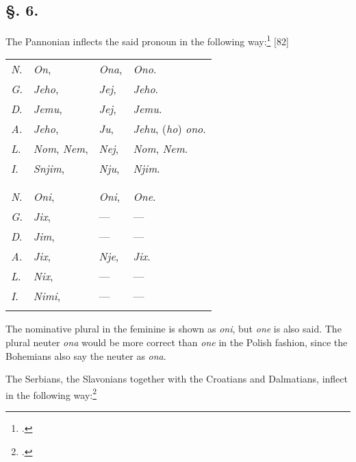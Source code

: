 \subsection*{\hspace*{\fill}§. 6.\hspace*{\fill}}

The Pannonian inflects the said pronoun in the following way:\footnote{\citet[64--65]{bernolak_grammatica_1790}.} [82]

\begin{longtable}{ l l l l }
    \lsptoprule
    \multicolumn{4}{ c }{Singular.} \\
    \midrule
    \textit{N}. & \textit{On}, & \textit{Ona}, & \textit{Ono}. \\
    \textit{G}. & \textit{Jeho}, & \textit{Jej}, & \textit{Jeho}. \\
    \textit{D}. & \textit{Jemu}, & \textit{Jej}, & \textit{Jemu}. \\
    \textit{A}. & \textit{Jeho}, & \textit{Ju}, & \textit{Jehu}, (\textit{ho}) \textit{ono}. \\
    \textit{L}. & \textit{Nom}, \textit{Nem}, & \textit{Nej}, & \textit{Nom}, \textit{Nem}. \\
    \textit{I}. & \textit{Snjim}, & \textit{Nju}, & \textit{Njim}. \\
    \lspbottomrule
    \\
    \lsptoprule
    \multicolumn{4}{ c }{Plural.} \\
    \midrule
    \textit{N}. & \textit{Oni}, & \textit{Oni}, & \textit{One}. \\
    \textit{G}. & \textit{Jix}, & — & — \\
    \textit{D}. & \textit{Jim}, & — & — \\
    \textit{A}. & \textit{Jix}, & \textit{Nje}, & \textit{Jix}. \\
    \textit{L}. & \textit{Nix}, & — & — \\
    \textit{I}. & \textit{Nimi}, & — & — \\
    \lspbottomrule
\end{longtable}

The nominative plural in the feminine is shown as \textit{oni}, but \textit{one} is also said. The plural neuter \textit{ona} would be more correct than \textit{one} in the Polish fashion, since the Bohemians also say the neuter as \textit{ona}.

The Serbians, the Slavonians together with the Croatians and Dalmatians, inflect in the following way:\footnote{\citet[xlix-l]{karadzic_srpski_1818}.}

